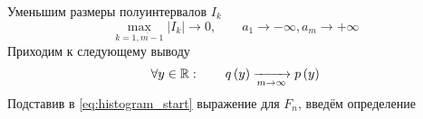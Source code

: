 Уменьшим размеры полуинтервалов $I_k$
\begin{equation*}
  \max\limits_{k=\overline{1,m-1}} \left| I_k \right| \rightarrow 0,
  \qquad a_1 \rightarrow -\infty, a_m \rightarrow +\infty
\end{equation*}
Приходим к следующему выводу
\begin{equation*}
  \forall y \in \mathbb{R}:\qquad
  q\left(y\right)\xrightarrow[m\to\infty]{}p\left(y\right)
\end{equation*}
Подставив в \ref{eq:histogram_start} выражение для $F_n$, введём определение
\begin{comment}
Функция $q_n$ называется гистограммой.
\index{гистограмма}
Избавимся от $a_j$ в формуле, а для этого вспомним, чему равно $\cdfn{x}$
$$\cdfn{x}= \frac{1}{n}\cdot \sum_{k=1}^n
\indicator{x_k\le x}$$

Теперь посмотрим, чему равна разность $\cdfn{a_j}-\cdfn{a_{j-1}}$,
которая, как мы видим, является вероятностью того,
что $x$ попало в отрезок $I_j$
\begin{align*}
  \cdfn{a_j}-\cdfn{a_{j-1}}= \\
  = \frac{1}{n}\cdot \sum_{k=1}^n
    \indicator{x_k\le a_j}-\frac{1}{n}\cdot \sum_{k=1}^n
    \indicator{x_k\le a_{j-1}}
\end{align*}

Сгруппируем слагаемые и получим чуть более компактную запись разности
\begin{eqnarray}\label{eq:cdfn_difference}
  \cdfn{a_j}-\cdfn{a_{j-1}}= \nonumber\\
  = \frac{1}{n}\cdot \sum_{k=1}^n
    \left[\indicator{x_k\le a_j}-\indicator{x_k\le a_{j-1}}\right]
\end{eqnarray}

Рассмотрим возможные значения индикаторов

Если оба индикатора равны единице,
это значит, что $x_k$ не больше $a_j$ и не больше $a_{j-1}$.
Поскольку $a_{j-1}\le a_j$, то можно обойтись тем, что $x\le a_{j-1}$
\begin{align*}
  \begin{cases}
    \indicator{x_k\le a_j}=1\\
    \indicator{x_k\le a_{j-1}}=1\\
    a_{j-1} < a_j
  \end{cases}
  \Rightarrow
  \begin{cases}
    x_k\le a_j\\
    x_k\le a_{j-1}\\
    a_{j-1} < a_j
  \end{cases}
  \\\Rightarrow
    x_k\le a_{j-1} < a_j
  \Rightarrow
    x_k\le a_{j-1}
\end{align*}


\end{comment}

